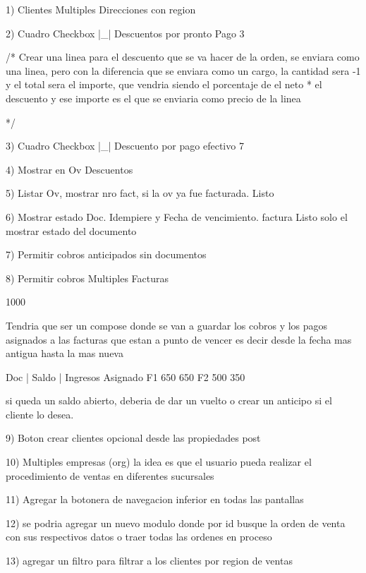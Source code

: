 1) Clientes Multiples Direcciones con region

2) Cuadro Checkbox |_| Descuentos por pronto Pago 3%

/*
    Crear una linea para el descuento que se va hacer de la orden, 
    se enviara como una linea, pero con la diferencia que se enviara como un cargo, 
    la cantidad sera -1
    y el total sera el importe, que vendria siendo el porcentaje de el neto * el descuento 
    y ese importe es el que se enviaria como precio de la linea 

*/


3) Cuadro Checkbox |_| Descuento por pago efectivo 7%

4) Mostrar en Ov Descuentos 

5) Listar Ov, mostrar nro fact, si la ov ya fue facturada. Listo

6) Mostrar estado Doc. Idempiere y Fecha de vencimiento. factura Listo solo el mostrar estado del documento 

7) Permitir cobros anticipados sin documentos 

8) Permitir cobros Multiples Facturas 

1000

Tendria que ser un compose donde se van a guardar los cobros y los pagos asignados a las facturas que estan a punto de vencer
es decir desde la fecha mas antigua hasta la mas nueva  

Doc | Saldo | Ingresos Asignado
F1     650      650 
F2     500      350 

si queda un saldo abierto, deberia de dar un vuelto o crear un anticipo si el cliente lo desea. 

9) Boton crear clientes opcional desde las propiedades post

10) Multiples empresas (org) la idea es que el usuario pueda realizar el procedimiento de ventas en diferentes sucursales 

11) Agregar la botonera de navegacion inferior en todas las pantallas 




12) se podria agregar un nuevo modulo donde por id busque la orden de venta con sus respectivos datos o 
traer todas las ordenes en proceso

13) agregar un filtro para filtrar a los clientes por region de ventas